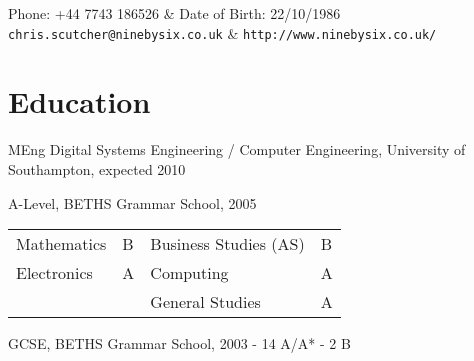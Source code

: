 \documentclass[overlapped,line,letterpaper]{res}
\begin{document}

\setlength{\leftmargini}{0em}
\setlength{\leftmargin}{1.5cm}
\setlength{\rightmargin}{1.5cm}
\setlength{\textheight}{800pt}
\setlength{\voffset}{-0.5in}
\renewcommand{\labelitemi}{}

\renewcommand{\namefont}{\large\textbf}



\begin{resume}

\begin{ncolumn}{2}
  Phone: +44 7743 186526                & Date of Birth: 22/10/1986 \\
  {\tt chris.scutcher@ninebysix.co.uk}  & {\tt \verb+http://www.ninebysix.co.uk/+}
\end{ncolumn}


\section{\bf Education}
MEng Digital Systems Engineering / Computer Engineering, University of
Southampton, expected 2010

A-Level, BETHS Grammar School, 2005						\\
\hspace*{1cm}
\begin{tabulary}{\textwidth}{p{4cm}p{0.5cm}p{4cm}p{0.5cm}}
Mathematics	&	B	&	Business Studies (AS)	&	B	\\
Electronics	&	A	&	Computing		&	A	\\
		&		&	General Studies		&	A	\\
\end{tabulary}

GCSE, BETHS Grammar School, 2003	- 14 A/A* - 2  B




\end{resume}
\end{document}

